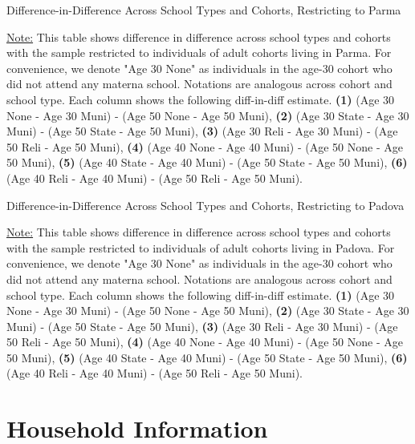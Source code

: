 \documentclass[11pt]{article}
\begin{document}
\begin{table}[H]
\begin{center}
	\caption{Difference-in-Difference Across School Types and Cohorts, Restricting to Parma}
	\scalebox{0.80}{
		}
\end{center}
\footnotesize
\underline{Note:} This table shows difference in difference across school types and cohorts with the sample restricted to individuals of adult cohorts living in Parma. For convenience, we denote "Age 30 None" as individuals in the age-30 cohort who did not attend any materna school. Notations are analogous across cohort and school type. Each column shows the following diff-in-diff estimate. \textbf{(1)} (Age 30 None - Age 30 Muni) - (Age 50 None - Age 50 Muni), \textbf{(2)} (Age 30 State - Age 30 Muni) - (Age 50 State - Age 50 Muni), \textbf{(3)} (Age 30 Reli - Age 30 Muni) - (Age 50 Reli - Age 50 Muni), \textbf{(4)} (Age 40 None - Age 40 Muni) - (Age 50 None - Age 50 Muni),  \textbf{(5)} (Age 40 State - Age 40 Muni) - (Age 50 State - Age 50 Muni), \textbf{(6)} (Age 40 Reli - Age 40 Muni) - (Age 50 Reli - Age 50 Muni). 
\end{table}

\begin{table}[H]
\begin{center}
	\caption{Difference-in-Difference Across School Types and Cohorts, Restricting to Padova}
	\scalebox{0.80}{
		}
\end{center}
\footnotesize
\underline{Note:} This table shows difference in difference across school types and cohorts with the sample restricted to individuals of adult cohorts living in Padova. For convenience, we denote "Age 30 None" as individuals in the age-30 cohort who did not attend any materna school. Notations are analogous across cohort and school type. Each column shows the following diff-in-diff estimate. \textbf{(1)} (Age 30 None - Age 30 Muni) - (Age 50 None - Age 50 Muni), \textbf{(2)} (Age 30 State - Age 30 Muni) - (Age 50 State - Age 50 Muni), \textbf{(3)} (Age 30 Reli - Age 30 Muni) - (Age 50 Reli - Age 50 Muni), \textbf{(4)} (Age 40 None - Age 40 Muni) - (Age 50 None - Age 50 Muni),  \textbf{(5)} (Age 40 State - Age 40 Muni) - (Age 50 State - Age 50 Muni), \textbf{(6)} (Age 40 Reli - Age 40 Muni) - (Age 50 Reli - Age 50 Muni). 
\end{table}



\section{Household Information}
\end{document}
